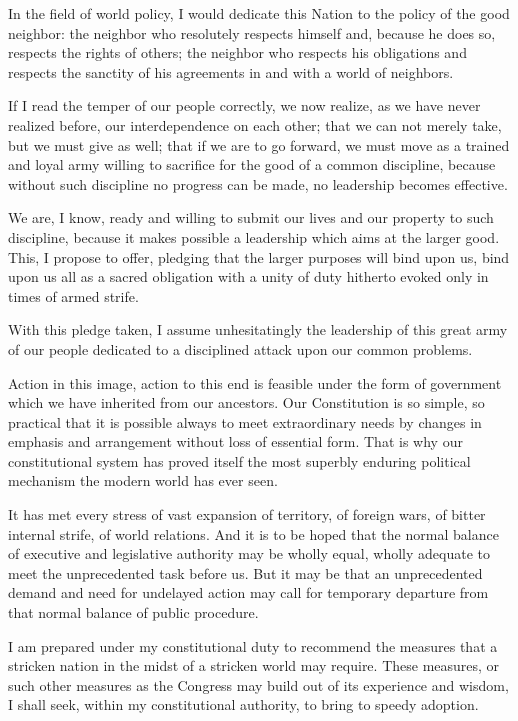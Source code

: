 \documentclass[a4paper]{amsbook}
\begin{document}
In the field of world policy, I would dedicate this Nation to the policy of the good neighbor: the neighbor who resolutely respects himself and, because he does so, respects the rights of others; the neighbor who respects his obligations and respects the sanctity of his agreements in and with a world of neighbors.

If I read the temper of our people correctly, we now realize, as we have never realized before, our interdependence on each other; that we can not merely take, but we must give as well; that if we are to go forward, we must move as a trained and loyal army willing to sacrifice for the good of a common discipline, because without such discipline no progress can be made, no leadership becomes effective.

We are, I know, ready and willing to submit our lives and our property to such discipline, because it makes possible a leadership which aims at the larger good. This, I propose to offer, pledging that the larger purposes will bind upon us, bind upon us all as a sacred obligation with a unity of duty hitherto evoked only in times of armed strife.

With this pledge taken, I assume unhesitatingly the leadership of this great army of our people dedicated to a disciplined attack upon our common problems.

Action in this image, action to this end is feasible under the form of government which we have inherited from our ancestors. Our Constitution is so simple, so practical that it is possible always to meet extraordinary needs by changes in emphasis and arrangement without loss of essential form. That is why our constitutional system has proved itself the most superbly enduring political mechanism the modern world has ever seen.

It has met every stress of vast expansion of territory, of foreign wars, of bitter internal strife, of world relations. And it is to be hoped that the normal balance of executive and legislative authority may be wholly equal, wholly adequate to meet the unprecedented task before us. But it may be that an unprecedented demand and need for undelayed action may call for temporary departure from that normal balance of public procedure.

I am prepared under my constitutional duty to recommend the measures that a stricken nation in the midst of a stricken world may require. These measures, or such other measures as the Congress may build out of its experience and wisdom, I shall seek, within my constitutional authority, to bring to speedy adoption.
\end{document}
